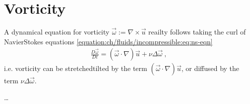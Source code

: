 \documentclass[letterpaper,10pt,english]{jupyterBook}
\begin{document}
\section{Vorticity}
\label{\detokenize{ch/fluids/incompressible:vorticity}}\label{\detokenize{ch/fluids/incompressible:fluid-mechanics-incompressible-vorticity}}
\sphinxAtStartPar
A dynamical equation for vorticity \(\vec{\omega} := \nabla \times \vec{u}\) reailty follows taking the curl of Navier\sphinxhyphen{}Stokes equations \eqref{equation:ch/fluids/incompressible:eq:ns-eqn}
\begin{equation}\label{equation:ch/fluids/incompressible:eq:vorticity}
\begin{split}\frac{D \vec{\omega}}{D t} = (\vec{\omega} \cdot \nabla) \vec{u} + \nu \Delta \vec{\omega} \ ,\end{split}
\end{equation}
\sphinxAtStartPar
i.e. vorticity can be stretched\sphinxhyphen{}tilted by the term \((\vec{\omega} \cdot \nabla) \vec{u}\), or diffused by the term \(\nu \Delta \vec{\omega}\).

\sphinxAtStartPar
…
\end{document}

